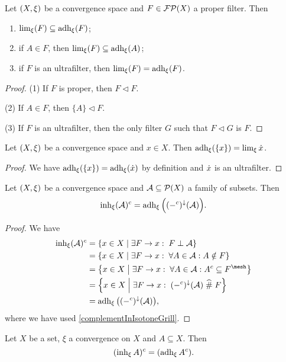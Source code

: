 \begin{lemma} \label{adherenceLimitFilter}
Let $\left( X,\xi \right)$ be a convergence space and $F\in \operatorname{\mathcal{FP}}(X)$ a proper filter. Then
\begin{enumerate}
\item $\lim_\xi(F) \subseteq \operatorname{adh}_\xi(F)$;
\item if $A\in F$, then $\lim_\xi(F)\subseteq \operatorname{adh}_\xi(A)$;
\item if $F$ is an ultrafilter, then $\lim_\xi(F) = \operatorname{adh}_\xi(F)$.
\end{enumerate}
\end{lemma}
\begin{proof}
(1) If $F$ is proper, then $F\lhd F$.

(2) If $A\in F$, then $\{A\}\lhd F$.

(3) If $F$ is an ultrafilter, then the only filter $G$ such that $F\lhd G$ is $F$.
\end{proof}
\begin{corollary} \label{singletonAdherence}
Let $\left( X,\xi \right)$ be a convergence space and $x\in X$. Then $\operatorname{adh}_\xi(\{x\}) = \lim_\xi \dot{x}$.
\end{corollary}
\begin{proof}
We have $\operatorname{adh}_\xi(\{x\}) = \operatorname{adh}_\xi(\dot{x})$ by definition and $\dot{x}$ is an ultrafilter.
\end{proof}

\begin{proposition} \label{inherenceComplementAdherence}
Let $\left( X,\xi \right)$ be a convergence space and $\mathcal{A}\subseteq \operatorname{\mathcal{P}}(X)$ a family of subsets. Then
\[ \operatorname{inh}_\xi(\mathcal{A})^c = \operatorname{adh}_\xi\Big((-^c)^{\downarrow}(\mathcal{A})\Big). \]
\end{proposition}
\begin{proof}
We have
\begin{align*}
\inh_\xi(\mathcal{A})^c &= \setbuilder{x\in X}{\exists F\to x: \; F\perp\mathcal{A}} \\
&= \setbuilder{x\in X}{\exists F\to x: \;\forall A\in\mathcal{A}: A\notin F} \\
&= \setbuilder{x\in X}{\exists F\to x: \; \forall A\in\mathcal{A}: A^c\subseteq F^\mesh} \\
&= \setbuilder{x\in X}{\exists F\to x: \; (-^c)^{\imf}(\mathcal{A}) \amesh F} \\
&= \adh_\xi\big((-^c)^{\imf}(\mathcal{A})\big),
\end{align*}
where we have used \ref{complementInIsotoneGrill}.
\end{proof}
\begin{corollary} \label{principalInherenceComplementAdherence}
Let $X$ be a set, $\xi$ a convergence on $X$ and $A \subseteq X$. Then
\[ (\operatorname{inh}_\xi A)^c = (\operatorname{adh}_\xi A^c). \]
\end{corollary}


